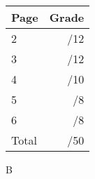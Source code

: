 \documentclass[12pt]{article}
\newcommand{\skipline}{\vspace{12pt}}
\begin{document}
\begin{table}[hbt]
\begin{center}
\begin{tabular}{|l|r|} \hline
Page&Grade\\
\hline \hline
\cline{1-2} 2 & \enspace\enspace\enspace\enspace\enspace\enspace/12\\
\cline{1-2} 3 & \enspace\enspace\enspace\enspace\enspace\enspace/12\\
\cline{1-2} 4 & \enspace\enspace\enspace\enspace\enspace\enspace/10\\
\cline{1-2} 5 & \enspace\enspace\enspace\enspace\enspace\enspace/8\\
\cline{1-2} 6 & \enspace\enspace\enspace\enspace\enspace\enspace/8\\
\cline{1-2} Total & \enspace\enspace\enspace\enspace\enspace\enspace/50\\
\hline
\end{tabular}

\skipline

\skipline



B
\end{center}
\end{table}
\newpage
\end{document}
